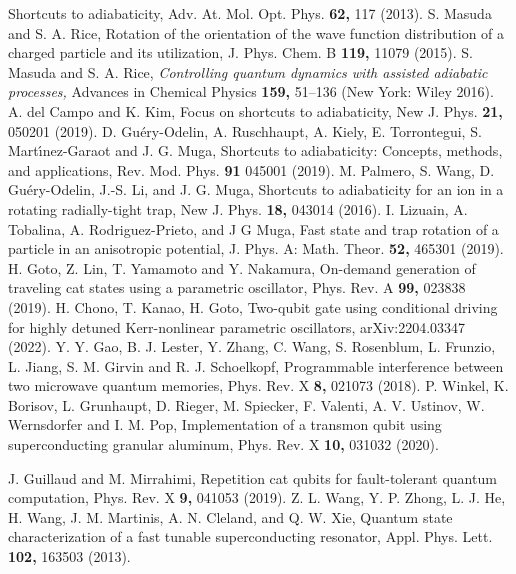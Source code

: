 \documentclass[%
 reprint,
 amsmath,amssymb,
 aps,
pra,
]{revtex4-2}
\begin{document}
\begin{thebibliography}{99}
Shortcuts to adiabaticity,
{Adv. At. Mol. Opt. Phys.} {\bf 62,} 117 (2013).
 S. Masuda and S. A. Rice, 
Rotation of the orientation of the wave function distribution of a charged particle and its utilization,
J. Phys. Chem. B {\bf 119,} 11079 (2015).
 S. Masuda and S. A. Rice, {\it Controlling quantum dynamics with assisted adiabatic processes,} {Advances in Chemical Physics} {\bf 159,} 51--136 (New York: Wiley 2016).
 A. del Campo and K. Kim, 
Focus on shortcuts to adiabaticity,
New J. Phys. {\bf 21,} 050201 (2019).
 D. Gu\'ery-Odelin, A. Ruschhaupt,  A. Kiely,  E. Torrontegui, S. Mart\'{\i}nez-Garaot and J. G. Muga, 
Shortcuts to adiabaticity: Concepts, methods, and applications,
{Rev. Mod. Phys.} {\bf 91} 045001 (2019).
 M. Palmero, S. Wang, D. Gu\'ery-Odelin, J.-S. Li, and J. G.
Muga, 
Shortcuts to adiabaticity for an ion in a rotating radially-tight trap,
New J. Phys. {\bf 18,} 043014 (2016).
 I. Lizuain, A. Tobalina, A. Rodriguez-Prieto, and J G Muga, 
Fast state and trap rotation of a particle in an anisotropic potential,
J. Phys. A: Math. Theor. {\bf 52,} 465301 (2019).
 H. Goto, Z. Lin, T. Yamamoto and Y. Nakamura, 
On-demand generation of traveling cat states using a parametric oscillator,
Phys. Rev. A {\bf 99,} 023838 (2019).
 H. Chono, T. Kanao, H. Goto, 
Two-qubit gate using conditional driving for highly detuned Kerr-nonlinear parametric oscillators,
arXiv:2204.03347 (2022).
 Y. Y. Gao, B. J. Lester, Y. Zhang, C. Wang,
S. Rosenblum, L. Frunzio, L. Jiang, S. M. Girvin and R. J. Schoelkopf, 
Programmable interference between two microwave quantum memories,
Phys. Rev. X {\bf 8,} 021073 (2018).
P. Winkel, K. Borisov, L. Grunhaupt, D. Rieger, M. Spiecker, F. Valenti, A. V. Ustinov, W. Wernsdorfer and I. M. Pop, 
Implementation of a transmon qubit using superconducting granular aluminum,
Phys. Rev. X {\bf 10,} 031032 (2020).


 J. Guillaud and M. Mirrahimi,  
Repetition cat qubits for fault-tolerant quantum computation,
Phys. Rev. X {\bf 9,} 041053 (2019).
 Z. L. Wang, Y. P. Zhong, L. J. He, H. Wang, J. M. Martinis, A. N. Cleland, and Q. W. Xie, 
Quantum state characterization of a fast tunable superconducting resonator,
Appl. Phys. Lett. {\bf 102,} 163503 (2013).



\end{thebibliography}
\end{document}
